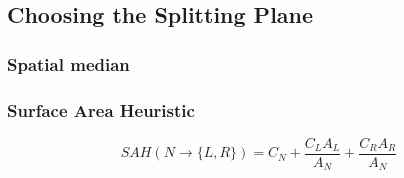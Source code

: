 

\subsection{Choosing the Splitting Plane}







\subsubsection{Spatial median}







\subsubsection{Surface Area Heuristic}



\begin{displaymath}
  SAH(N \rightarrow \{L, R\}) = C_N + \frac{C_L A_L}{A_N} +
  \frac{C_R A_R}{A_N}
\end{displaymath}

